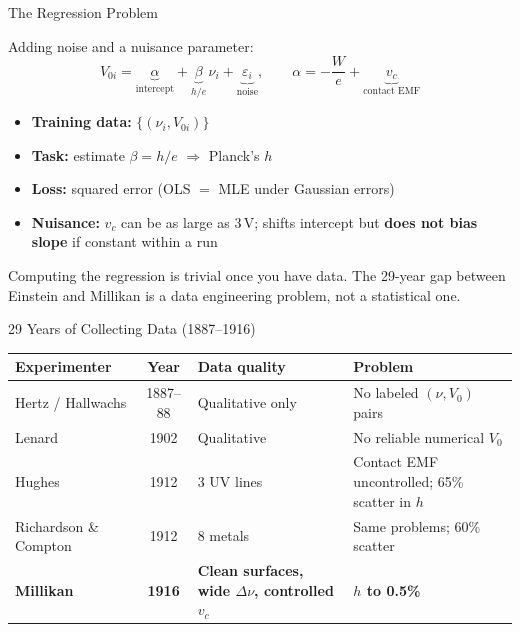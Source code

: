 \documentclass[aspectratio=169]{beamer}
\begin{document}
\begin{frame}{The Regression Problem}

Adding noise and a nuisance parameter:
\[
  V_{0i} = \underbrace{\alpha}_{\text{intercept}} +
            \underbrace{\beta}_{h/e}\,\nu_i +
            \underbrace{\varepsilon_i}_{\text{noise}},
  \qquad
  \alpha = -\frac{W}{e} + \underbrace{v_c}_{\text{contact EMF}}
\]

\medskip
\begin{itemize}
  \item \textbf{Training data:} $\{(\nu_i, V_{0i})\}$
  \item \textbf{Task:} estimate $\beta = h/e$ $\Rightarrow$ Planck's $h$
  \item \textbf{Loss:} squared error (OLS $=$ MLE under Gaussian errors)
  \item \textbf{Nuisance:} $v_c$ can be as large as 3\,V; shifts intercept
    but \textbf{does not bias slope} if constant within a run
\end{itemize}

\medskip
Computing the regression is trivial once you have data.
The 29-year gap between Einstein and Millikan is a data engineering problem,
not a statistical one.

\end{frame}

\begin{frame}{29 Years of Collecting Data (1887--1916)}

\begin{center}
\small
\begin{tabular}{p{3.2cm}cp{3.5cm}p{4.3cm}}
\toprule
Experimenter & Year & Data quality & Problem \\
\midrule
Hertz / Hallwachs & 1887--88 & Qualitative only & No labeled $(\nu,V_0)$ pairs \\
Lenard            & 1902     & Qualitative       & No reliable numerical $V_0$ \\
Hughes            & 1912     & 3 UV lines        & Contact EMF uncontrolled; 65\% scatter in $h$ \\
Richardson \& Compton & 1912 & 8 metals          & Same problems; 60\% scatter \\
\midrule
\textbf{Millikan} & \textbf{1916} &
  \textbf{Clean surfaces, wide $\Delta\nu$, controlled $v_c$} &
  \textbf{$h$ to 0.5\%} \\
\bottomrule
\end{tabular}
\end{center}

\end{frame}
\end{document}
